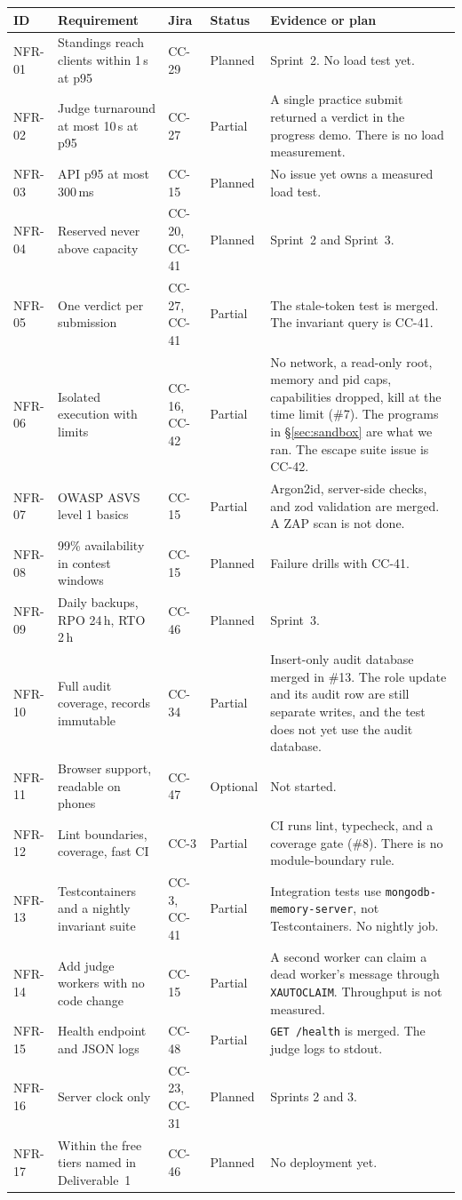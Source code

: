 \documentclass[11pt,a4paper]{article}
\begin{document}
{\footnotesize
\begin{longtable}{@{}l p{} l l p{}@{}}
\toprule
\rowcolor{thead} ID & Requirement & Jira & Status & Evidence or plan \\
\midrule
\endhead
NFR-01 & Standings reach clients within 1\,s at p95 & CC-29 & Planned & Sprint~2. No load test yet. \\
NFR-02 & Judge turnaround at most 10\,s at p95 & CC-27 & Partial &
A single practice submit returned a verdict in the progress demo. There is no load measurement. \\
NFR-03 & API p95 at most 300\,ms & CC-15 & Planned & No issue yet owns a measured load test. \\
NFR-04 & Reserved never above capacity & CC-20, CC-41 & Planned & Sprint~2 and Sprint~3. \\
NFR-05 & One verdict per submission & CC-27, CC-41 & Partial &
The stale-token test is merged. The invariant query is CC-41. \\
NFR-06 & Isolated execution with limits & CC-16, CC-42 & Partial &
No network, a read-only root, memory and pid caps, capabilities dropped, kill at the time limit (\#7). The programs in \S\ref{sec:sandbox} are what we ran. The escape suite issue is CC-42. \\
NFR-07 & OWASP ASVS level 1 basics & CC-15 & Partial &
Argon2id, server-side checks, and zod validation are merged. A ZAP scan is not done. \\
NFR-08 & 99\% availability in contest windows & CC-15 & Planned & Failure drills with CC-41. \\
NFR-09 & Daily backups, RPO 24\,h, RTO 2\,h & CC-46 & Planned & Sprint~3. \\
NFR-10 & Full audit coverage, records immutable & CC-34 & Partial &
Insert-only audit database merged in \#13. The role update and its audit row are still separate writes, and the test does not yet use the audit database. \\
NFR-11 & Browser support, readable on phones & CC-47 & Optional & Not started. \\
NFR-12 & Lint boundaries, coverage, fast CI & CC-3 & Partial &
CI runs lint, typecheck, and a coverage gate (\#8). There is no module-boundary rule. \\
NFR-13 & Testcontainers and a nightly invariant suite & CC-3, CC-41 & Partial &
Integration tests use \texttt{mongodb-memory-server}, not Testcontainers. No nightly job. \\
NFR-14 & Add judge workers with no code change & CC-15 & Partial &
A second worker can claim a dead worker's message through \texttt{XAUTOCLAIM}. Throughput is not measured. \\
NFR-15 & Health endpoint and JSON logs & CC-48 & Partial &
\texttt{GET /health} is merged. The judge logs to stdout. \\
NFR-16 & Server clock only & CC-23, CC-31 & Planned & Sprints 2 and 3. \\
NFR-17 & Within the free tiers named in Deliverable~1 & CC-46 & Planned & No deployment yet. \\
\bottomrule
\end{longtable}
}
\end{document}
